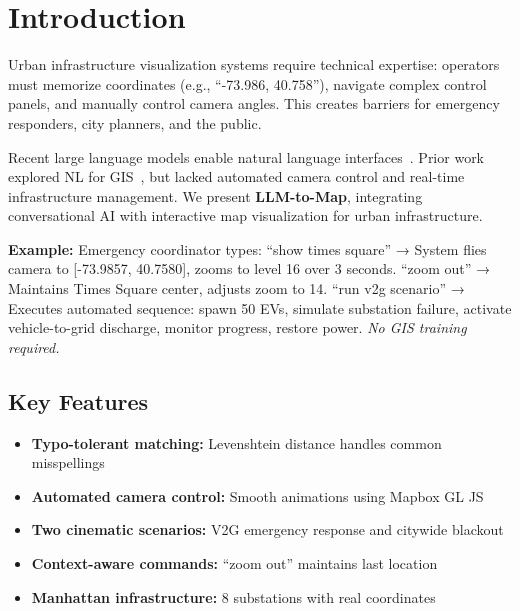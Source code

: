 \documentclass[sigconf]{acmart}
\begin{document}
\maketitle

\section{Introduction}

Urban infrastructure visualization systems require technical expertise: operators must memorize coordinates (e.g., ``-73.986, 40.758''), navigate complex control panels, and manually control camera angles. This creates barriers for emergency responders, city planners, and the public.

Recent large language models enable natural language interfaces~\cite{achiam2023gpt,zhou2023comprehensive}. Prior work explored NL for GIS~\cite{popescu2003natural,liu2023llm}, but lacked automated camera control and real-time infrastructure management. We present \textbf{LLM-to-Map}, integrating conversational AI with interactive map visualization for urban infrastructure.

\textbf{Example:} Emergency coordinator types: ``show times square'' → System flies camera to [-73.9857, 40.7580], zooms to level 16 over 3 seconds. ``zoom out'' → Maintains Times Square center, adjusts zoom to 14. ``run v2g scenario'' → Executes automated sequence: spawn 50 EVs, simulate substation failure, activate vehicle-to-grid discharge, monitor progress, restore power. \textit{No GIS training required.}

\subsection{Key Features}

\begin{itemize}
    \item \textbf{Typo-tolerant matching:} Levenshtein distance handles common misspellings
    \item \textbf{Automated camera control:} Smooth animations using Mapbox GL JS
    \item \textbf{Two cinematic scenarios:} V2G emergency response and citywide blackout
    \item \textbf{Context-aware commands:} ``zoom out'' maintains last location
    \item \textbf{Manhattan infrastructure:} 8 substations with real coordinates
\end{itemize}
\end{document}
